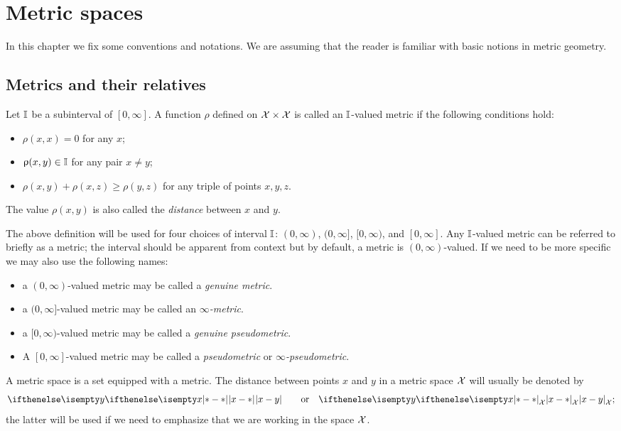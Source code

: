\chapter{Metric spaces}
In this chapter we fix some conventions and notations. We are assuming that the reader is familiar with basic notions in metric geometry.

\section{Metrics and their relatives}
\label{sec:metric spaces}

Let $\mathbb{I}$ be a subinterval of $[0,\infty]$.
A function $\rho$ defined on $\spc{X}\times\spc{X}$ is called an $\mathbb{I}$-valued metric if the following conditions hold:
\begin{itemize}
 \item $\rho(x,x)=0$ for any $x$;
 \item $\rho(x,y)\in \II$ for any pair $x\ne y$;
 \item $\rho(x,y)+\rho(x,z)\ge \rho(y,z)$ for any triple of points $x,y, z$.
\end{itemize}
The value $\rho(x,y)$ is also called the \emph{distance} between $x$ and $y$.


The above definition will be used for four choices of interval $\mathbb{I}$: $(0,\infty)$, $(0,\infty]$, $[0,\infty)$, and $[0,\infty]$.
Any $\mathbb{I}$-valued metric can be referred to briefly as a metric;
the interval should be apparent from context but by default, a metric is $(0,\infty)$-valued. 
If we need to be more specific we may also use the following names:
\begin{itemize}
\item a $(0,\infty)$-valued metric may be called a \emph{genuine metric}.
\item a $(0,\infty]$-valued metric may be called an \emph{$\infty$-metric}.
\item a $[0,\infty)$-valued metric may be called  a \emph{genuine pseudometric}.
\item A $[0,\infty]$-valued metric may be called a \emph{pseudometric} or \emph{$\infty$-pseudometric}.
\end{itemize}

A metric space is a set equipped with a metric.
The distance between points $x$ and $y$ in a metric space $\mathcal{X}$ will  usually be denoted by \[\dist{x}{y}{}\qquad\text{or}\quad \dist{x}{y}{\spc{X}};\]
the latter will be used if we need to emphasize that we are working in the space $\mathcal{X}$.

